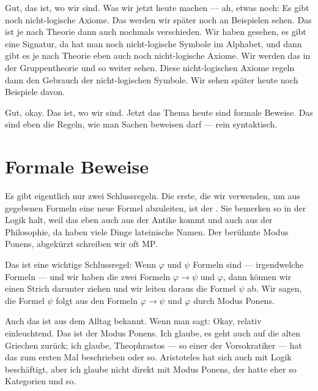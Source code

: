 \begin{spoken-clean}[00:11:15 - 00:13:30]

Gut, das ist, wo wir sind. Was wir jetzt heute machen --- ah, etwas noch: Es gibt noch nicht-logische Axiome. Das werden wir später noch an Beispielen sehen. Das ist je nach Theorie dann auch nochmals verschieden. Wir haben gesehen, es gibt eine Signatur, da hat man noch nicht-logische Symbole im Alphabet, und dann gibt es je nach Theorie eben auch noch nicht-logische Axiome. Wir werden das in der Gruppentheorie und so weiter sehen. Diese nicht-logischen Axiome regeln dann den Gebrauch der nicht-logischen Symbole. Wir sehen später heute noch Beispiele davon.

Gut, okay. Das ist, wo wir sind. Jetzt das Thema heute sind formale Beweise. Das sind eben die Regeln, wie man Sachen beweisen darf --- rein syntaktisch.
\end{spoken-clean}

\section{Formale Beweise}

\begin{spoken-clean}[00:13:30 - 00:15:45]
Es gibt eigentlich nur zwei Schlussregeln. Die erste, die wir verwenden, um aus gegebenen Formeln eine neue Formel abzuleiten, ist der . Sie bemerken so in der Logik halt, weil das eben auch aus der Antike kommt und auch aus der Philosophie, da haben viele Dinge lateinische Namen. Der berühmte Modus Ponens, abgekürzt schreiben wir oft $\text{MP}$.

Das ist eine wichtige Schlussregel: Wenn $\varphi$ und $\psi$ Formeln sind --- irgendwelche Formeln --- und wir haben die zwei Formeln $\varphi \rightarrow \psi$ und $\varphi$, dann können wir einen Strich darunter ziehen und wir leiten daraus die Formel $\psi$ ab. Wir sagen, die Formel $\psi$ folgt aus den Formeln $\varphi \rightarrow \psi$ und $\varphi$ durch Modus Ponens.

Auch das ist aus dem Alltag bekannt. Wenn man sagt:  Okay, relativ einleuchtend. Das ist der Modus Ponens. Ich glaube, es geht auch auf die alten Griechen zurück; ich glaube, Theophrastos --- so einer der Vorsokratiker --- hat das zum ersten Mal beschrieben oder so. Aristoteles hat sich auch mit Logik beschäftigt, aber ich glaube nicht direkt mit Modus Ponens, der hatte eher so Kategorien und so.
\end{spoken-clean}

